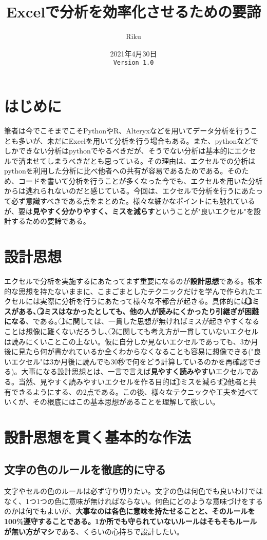 \documentclass[dvipdfmx]{jsarticle}
\title{Excelで分析を効率化させるための要諦}
\author{Riku}
\date{2021年4月30日\\
\texttt{Version 1.0}}
\begin{document}
\maketitle
\tableofcontents
\section{はじめに}
筆者は今でこそまでこそPythonやR、Alteryxなどを用いてデータ分析を行うことも多いが、未だにExcelを用いて分析を行う場合もある。また、pythonなどでしかできない分析はpythonでやるべきだが、そうでない分析は基本的にエクセルで済ませてしまうべきだとも思っている。その理由は、エクセルでの分析はpythonを利用した分析に比べ他者への共有が容易であるためである。そのため、コードを書いて分析を行うことが多くなった今でも、エクセルを用いた分析からは逃れられないのだと感じている。今回は、エクセルで分析を行うにあたって必ず意識すべきである点をまとめた。様々な細かなポイントにも触れているが、要は\textbf{見やすく分かりやすく、ミスを減らす}ということが"良いエクセル"を設計するための要諦である。

\section{設計思想}
エクセルで分析を実施するにあたってまず重要になるのが\textbf{設計思想}である。根本的な思想を持たないままに、こまごまとしたテクニックだけを学んで作られたエクセルには実際に分析を行うにあたって様々な不都合が起きる。具体的には\textbf{\textcircled{\scriptsize 1}ミスがある、\textcircled{\scriptsize 2}ミスはなかったとしても、他の人が読みにくかったり引継ぎが困難になる}、である。\textcircled{\scriptsize 1}に関しては、一貫した思想が無ければミスが起きやすくなることは想像に難くないだろうし、\textcircled{\scriptsize 2}に関しても考え方が一貫していないエクセルは読みにくいことこの上ない。仮に自分しか見ないエクセルであっても、3か月後に見たら何が書かれているか全くわからなくなることも容易に想像できる("良いエクセル"は3か月後に読んでも30秒で何をどう計算しているのかを再確認できる)。大事になる設計思想とは、一言で言えば\textbf{見やすく読みやすい}エクセルである。当然、見やすく読みやすいエクセルを作る目的は\textcircled{\scriptsize 1}ミスを減らす\textcircled{\scriptsize 2}他者と共有できるようにする、の2点である。この後、様々なテクニックや工夫を述べていくが、その根底にはこの基本思想があることを理解して欲しい。

\section{設計思想を貫く基本的な作法}
\subsection{文字の色のルールを徹底的に守る}
文字やセルの色のルールは必ず守り切りたい。文字の色は何色でも良いわけではなく、1つ1つの色に意味が無ければならない。何色にどのような意味づけをするのかは何でもよいが、\textbf{大事なのは各色に意味を持たせることと、そのルールを100\%遵守することである。1か所でも守られていないルールはそもそもルールが無い方がマシ}である、くらいの心持ちで設計したい。
\end{document}

